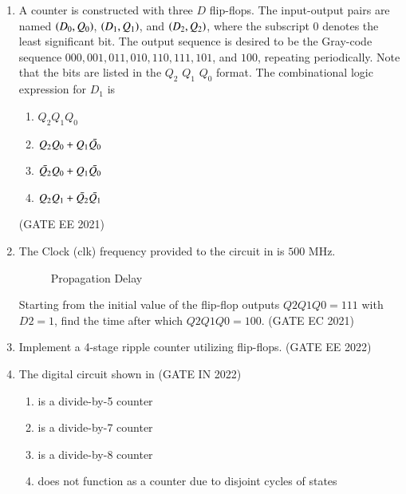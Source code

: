\begin{enumerate}[label=\arabic*.,ref=\theenumi]
%
\item A counter is constructed with three $D$ flip-flops. The input-output pairs are named $\left(D_0, Q_0\right)$, $\left(D_1, Q_1\right)$, and $\left(D_2, Q_2\right)$, where the subscript $0$ denotes the least significant bit. The output sequence is desired to be the Gray-code sequence $000, 001, 011, 010, 110, 111, 101$, and $100$, repeating periodically. Note that the bits are listed in the $Q_2$  $Q_1$  $Q_0$ format. The combinational logic expression for $D_1$ is
%
\begin{enumerate}
    \item $Q_2 Q_1 Q_0$
    \item $Q_2 Q_0 + Q_1 \Bar{Q_0}$
    \item $\Bar{Q_2} Q_0 + Q_1 \Bar{Q_0}$
    \item $Q_2 Q_1 + \Bar{Q_2} \Bar{Q_1}$
\end{enumerate}
\hfill(GATE EE 2021)
%
\item 
 The Clock (clk) frequency provided to the circuit 
in	
is $500$ MHz.
%
	\begin{figure}[H]
    \centering
    \resizebox{0.75\columnwidth}{!}{%
    
		}
    \caption{Propagation Delay}
	\label{fig:PropagationDelay}
\end{figure}
Starting from the initial value of the flip-flop outputs $Q2Q1Q0 =1 1 1$ with $D2=1$, find the time after which $Q2Q1Q0=1 0 0$. 
\hfill(GATE EC 2021)
%
\item Implement a 4-stage ripple counter utilizing flip-flops.
\label{gate-ee-2022-29}
\hfill (GATE EE 2022)
%
\item The digital circuit shown 
in 
		\hfill (GATE IN 2022)
\begin{enumerate}
    \item is a divide-by-5 counter
    \item is a divide-by-7 counter
    \item is a divide-by-8 counter
    \item does not function as a counter due to disjoint cycles of states 
\end{enumerate}
%
	\begin{figure}[H]
    \centering
\end{figure}
\end{enumerate}
